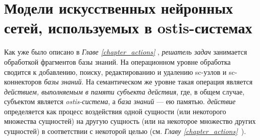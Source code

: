 \section{Модели искусственных нейронных сетей, используемых в ostis-системах}
\label{sec_chapter_ann_models}

Как уже было описано в \textit{Главе \ref{chapter_actions} }, \textit{решатель задач} занимается обработкой фрагментов базы знаний. На операционном уровне обработка сводится к добавлению, поиску, редактированию и удалению sc-узлов и sc-коннекторов \textit{базы знаний}. На семантическом же уровне такая операция является \textit{действием, выполняемым в памяти субъекта действия}, где, в общем случае, субъектом является \textit{ostis-система}, а \textit{база знаний} --- ею памятью. \textit{действие} определяется как процесс воздействия одной сущности (или некоторого множества сущностей) на другую сущность (или на некоторое множество других сущностей) в соответствии с некоторой целью (см. \textit{Главу \ref{chapter_actions}~}).

